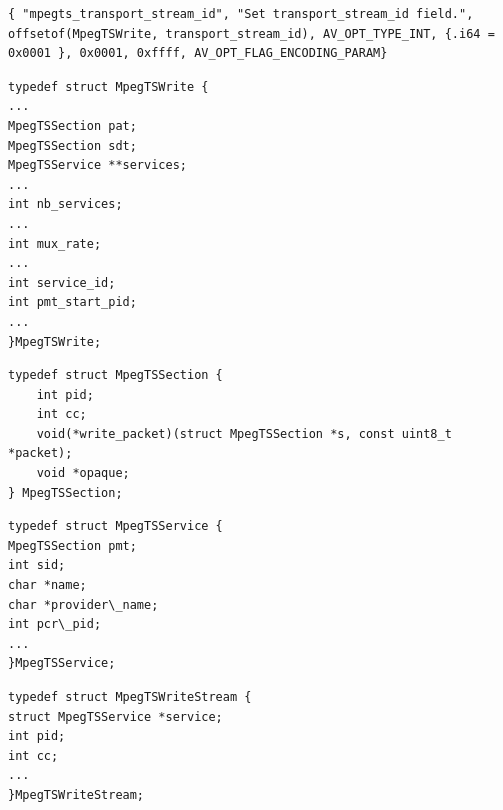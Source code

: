 \documentclass[
	12pt,				%
	openright,			%
	twoside,			%
	a4paper,			%
	brazil,
	french,				%
	english
	]{abntex2}
\begin{document}
\begin{lstlisting}[caption={Example of input option}, label=lst_input_option]
{ "mpegts_transport_stream_id", "Set transport_stream_id field.", offsetof(MpegTSWrite, transport_stream_id), AV_OPT_TYPE_INT, {.i64 = 0x0001 }, 0x0001, 0xffff, AV_OPT_FLAG_ENCODING_PARAM}
\end{lstlisting}

\begin{lstlisting}[caption={Excerpt of MpegTSWrite structure}, label=lst_MpegTSWrite]
typedef struct MpegTSWrite {
...
MpegTSSection pat;
MpegTSSection sdt;
MpegTSService **services;
...
int nb_services;
...
int mux_rate;
...
int service_id;
int pmt_start_pid;
...
}MpegTSWrite;
\end{lstlisting}

\begin{lstlisting}[caption={Excerpt of MpegTSSection structure}, label=lst_MpegTSSection]
typedef struct MpegTSSection {
	int pid;
	int cc;
	void(*write_packet)(struct MpegTSSection *s, const uint8_t *packet);
	void *opaque;
} MpegTSSection;
\end{lstlisting}

\begin{lstlisting}[caption={Excerpt of MpegTSService structure}, label=lst_MpegTSService]
typedef struct MpegTSService {
MpegTSSection pmt; 
int sid; 
char *name;
char *provider\_name;
int pcr\_pid;
...
}MpegTSService;
\end{lstlisting}

\begin{lstlisting}[caption={Excerpt of MpegTSWriteStream structure}, label=lst_MpegTSWriteStream]
typedef struct MpegTSWriteStream {
struct MpegTSService *service;
int pid;
int cc;
...
}MpegTSWriteStream;
\end{lstlisting}

\end{document}
